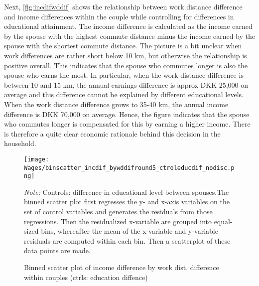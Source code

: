 Next, \autoref{fig:incdifwddif} shows the relationship between work distance difference and income differences within the couple while controlling for differences in educational attainment. The income difference is calculated as the income earned by the spouse with the highest commute distance minus the income earned by the spouse with the shortest commute distance. The picture is a bit unclear when work differences are rather short below 10 km, but otherwise the relationship is positive overall. This indicates that the spouse who commutes longer is also the spouse who earns the most. In particular, when the work distance difference is between 10 and 15 km, the annual earnings difference is approx DKK 25,000 on average and this difference cannot be explained by different educational levels. When the work distance difference grows to 35-40 km, the annual income difference is DKK 70,000 on average. Hence, the figure indicates that the spouse who commutes longer is compensated for this by earning a higher income. There is therefore a quite clear economic rationale behind this decision in the household.
\begin{figure}[!htb]
\centering
\begin{minipage}{0.8\textwidth}
\texttt{[image: Wages/binscatter\_incdif\_bywddifround5\_ctroleducdif\_nodisc.png]} 
{\tiny \emph{Note:} Controls: difference in educational level between spouses.The binned scatter plot first regresses the y- and x-axis variables on the set of control variables and generates the residuals from those regressions. Then the residualized x-variable are grouped into equal-sized bins, whereafter the mean of the x-variable and y-variable residuals are computed within each bin. Then a scatterplot of these data points are made.\par}
\end{minipage}
\caption{Binned scatter plot of income difference by work dist. difference within couples (ctrls: education diffence)}
\label{fig:incdifwddif}
\end{figure}
% 

